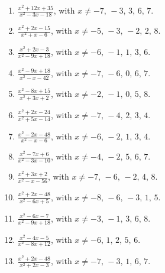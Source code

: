\documentclass[11pt,oneside]{book}
\begin{document}
\begin{enumerate}[leftmargin=*,label=\textbf{L\arabic*.},itemsep=0.45\baselineskip]
\item $\displaystyle \frac{x^{2} + 12 x + 35}{x^{2} - 3 x - 18}$, with $x\ne -7,\,-3,\,3,\,6,\,7$.
\item $\displaystyle \frac{x^{2} + 2 x - 15}{x^{2} + x - 6}$, with $x\ne -5,\,-3,\,-2,\,2,\,8$.
\item $\displaystyle \frac{x^{2} + 2 x - 3}{x^{2} - 9 x + 18}$, with $x\ne -6,\,-1,\,1,\,3,\,6$.
\item $\displaystyle \frac{x^{2} - 9 x + 18}{x^{2} - x - 42}$, with $x\ne -7,\,-6,\,0,\,6,\,7$.
\item $\displaystyle \frac{x^{2} - 8 x + 15}{x^{2} + 3 x + 2}$, with $x\ne -2,\,-1,\,0,\,5,\,8$.
\item $\displaystyle \frac{x^{2} + 2 x - 24}{x^{2} + 5 x - 14}$, with $x\ne -7,\,-4,\,2,\,3,\,4$.
\item $\displaystyle \frac{x^{2} - 2 x - 48}{x^{2} - x - 6}$, with $x\ne -6,\,-2,\,1,\,3,\,4$.
\item $\displaystyle \frac{x^{2} - 7 x + 6}{x^{2} - 3 x - 10}$, with $x\ne -4,\,-2,\,5,\,6,\,7$.
\item $\displaystyle \frac{x^{2} + 3 x + 2}{x^{2} - x - 56}$, with $x\ne -7,\,-6,\,-2,\,4,\,8$.
\item $\displaystyle \frac{x^{2} + 2 x - 48}{x^{2} - 6 x + 5}$, with $x\ne -8,\,-6,\,-3,\,1,\,5$.
\item $\displaystyle \frac{x^{2} - 6 x - 7}{x^{2} - 9 x + 18}$, with $x\ne -3,\,-1,\,3,\,6,\,8$.
\item $\displaystyle \frac{x^{2} - 4 x - 5}{x^{2} - 8 x + 12}$, with $x\ne -6,\,1,\,2,\,5,\,6$.
\item $\displaystyle \frac{x^{2} + 2 x - 48}{x^{2} + 2 x - 3}$, with $x\ne -7,\,-3,\,1,\,6,\,7$.
\end{enumerate}
\end{document}
